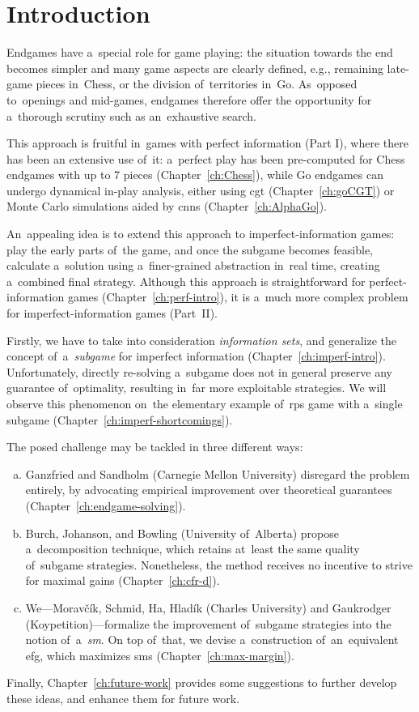 \chapter*{Introduction}
Endgames have a~special role for game playing:
the situation towards the end becomes simpler and many game aspects are clearly defined, e.g., remaining late-game pieces in~Chess, or the division of~territories in~Go.
As~opposed to~openings and mid-games, endgames therefore offer the opportunity for a~thorough scrutiny such as an~exhaustive search.

This approach is fruitful in~games with perfect information (Part I), where there has been an extensive use of~it:
a~perfect play has been pre-computed for Chess endgames with up to 7 pieces (Chapter~\ref{ch:Chess}), while Go endgames can undergo dynamical in-play analysis, either using \acrlong{cgt} (Chapter~\ref{ch:goCGT}) or Monte Carlo simulations aided by \acrlong{cnn}s (Chapter~\ref{ch:AlphaGo}).

An~appealing idea is to extend this approach to imperfect-information games:
play the early parts of~the game, and once the subgame becomes feasible, calculate a~solution using a~finer-grained abstraction in~real time, creating a~combined final strategy.
Although this approach is straightforward for perfect-information games (Chapter~\ref{ch:perf-intro}), it is a~much more complex problem for imperfect-information games (Part~II).

Firstly, we have to take into consideration \emph{information sets}, and generalize the concept of~a~\emph{subgame} for imperfect information (Chapter~\ref{ch:imperf-intro}).
Unfortunately, directly re-solving a~subgame does not in general preserve any guarantee of~optimality, resulting in~far more exploitable strategies.
We will observe this phenomenon on~the elementary example of~\acrlong{rps} game with a~single subgame (Chapter~\ref{ch:imperf-shortcomings}).

The posed challenge may be tackled in three different ways:
\begin{enumerate}[(a)]
  \item Ganzfried and Sandholm (Carnegie Mellon University) disregard the problem entirely, by advocating empirical improvement over theoretical guarantees (Chapter~\ref{ch:endgame-solving}).
  \item Burch, Johanson, and Bowling (University of~Alberta) propose a~decomposition technique, which retains at~least the same quality of~subgame strategies.
    Nonetheless, the method receives no incentive to strive for maximal gains (Chapter~\ref{ch:cfr-d}).
  \item We---Moravčík, Schmid, Ha, Hladík (Charles University) and Gaukrodger  (Koypetition)---formalize the improvement of~subgame strategies into the notion of~a~\emph{\acrlong{sm}}.
    On top of~that, we devise a~construction of~an~equivalent \acrlong{efg}, which maximizes \acrlong{sm}s (Chapter~\ref{ch:max-margin}).
\end{enumerate}

Finally, Chapter~\ref{ch:future-work} provides some suggestions to further develop these ideas, and enhance them for future work.
